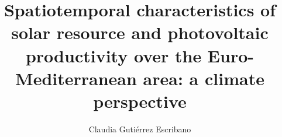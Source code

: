 \documentclass[oldfontcommands, a4paper, 12pt]{memoir}%
\begin{document}

   
\begin{titlingpage}


\title{Spatiotemporal characteristics of solar resource and photovoltaic productivity over the Euro-Mediterranean area: a climate perspective}%

\author{Claudia Gutiérrez Escribano}
\date{}

\maketitle


\end{titlingpage}

 \frontmatter


\cleardoublepage



% 
%


%



\clearpage

% 
\tableofcontents
 

\end{document}
